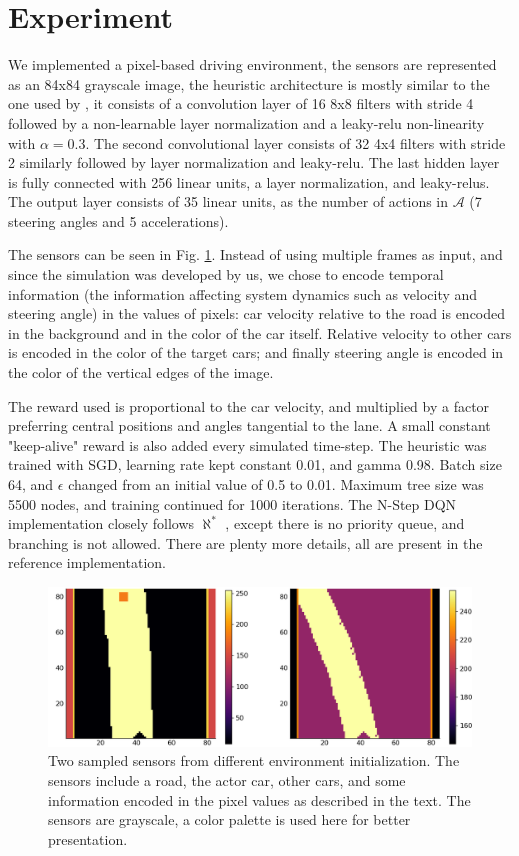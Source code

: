 \documentclass{article}
\newcommand{\alephstar}{$\aleph^*$ }
\begin{document}
\section{Experiment}
\label{sec:experiment}

We implemented a pixel-based driving environment, the sensors are represented as an 84x84 grayscale image, the heuristic architecture is mostly similar to the one used by \cite{mnih2013playing}, it consists of a convolution layer of 16 8x8 filters with stride 4 followed by a non-learnable layer normalization \citep{ba2016layer} and a leaky-relu non-linearity \citep{xu2015empirical} with $\alpha=0.3$. The second convolutional layer consists of 32 4x4 filters with stride 2 similarly followed by layer normalization and leaky-relu. The last hidden layer is fully connected with 256 linear units, a layer normalization, and leaky-relus. The output layer consists of 35 linear units, as the number of actions in $\mathcal{A}$ (7 steering angles and 5 accelerations).

The sensors can be seen in Fig. \ref{fig:sensors}. Instead of using multiple frames as input, and since the simulation was developed by us, we chose to encode temporal information (the information affecting system dynamics such as velocity and steering angle) in the values of pixels: car velocity relative to the road is encoded in the background and in the color of the car itself. Relative velocity to other cars is encoded in the color of the target cars; and finally steering angle is encoded in the color of the vertical edges of the image.

The reward used is proportional to the car velocity, and multiplied by a factor preferring central positions and angles tangential to the lane. A small constant "keep-alive" reward is also added every simulated time-step. The heuristic was trained with SGD, learning rate kept constant 0.01, and gamma 0.98. Batch size 64, and $\epsilon$ changed from an initial value of 0.5 to 0.01. Maximum tree size was 5500 nodes, and training continued for 1000 iterations. The N-Step DQN implementation closely follows \alephstar, except there is no priority queue, and branching is not allowed. There are plenty more details, all are present in the reference implementation.

\begin{figure}
  \centering
  \includegraphics[width=1.0\textwidth]{images/sensors.png}
  \caption{Two sampled sensors from different environment initialization. The sensors include a road, the actor car, other cars, and some information encoded in the pixel values as described in the text. The sensors are grayscale, a color palette is used here for better presentation. }
  \label{fig:sensors}
\end{figure}
\end{document}
